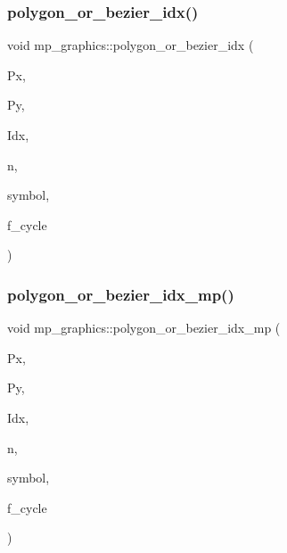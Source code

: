 \subsubsection{\texorpdfstring{polygon\+\_\+or\+\_\+bezier\+\_\+idx()}{polygon\_or\_bezier\_idx()}}
{\footnotesize\ttfamily void mp\+\_\+graphics\+::polygon\+\_\+or\+\_\+bezier\+\_\+idx (\begin{DoxyParamCaption}\item[{\mbox{\hyperlink{galois_8h_a09fddde158a3a20bd2dcadb609de11dc}{I\+NT}} $\ast$}]{Px,  }\item[{\mbox{\hyperlink{galois_8h_a09fddde158a3a20bd2dcadb609de11dc}{I\+NT}} $\ast$}]{Py,  }\item[{\mbox{\hyperlink{galois_8h_a09fddde158a3a20bd2dcadb609de11dc}{I\+NT}} $\ast$}]{Idx,  }\item[{\mbox{\hyperlink{galois_8h_a09fddde158a3a20bd2dcadb609de11dc}{I\+NT}}}]{n,  }\item[{const char $\ast$}]{symbol,  }\item[{\mbox{\hyperlink{galois_8h_a09fddde158a3a20bd2dcadb609de11dc}{I\+NT}}}]{f\+\_\+cycle }\end{DoxyParamCaption})}

\mbox{\label{classmp__graphics_ac1c736f6c02abd6df696eb949c3513ac}} 
\subsubsection{\texorpdfstring{polygon\+\_\+or\+\_\+bezier\+\_\+idx\+\_\+mp()}{polygon\_or\_bezier\_idx\_mp()}}
{\footnotesize\ttfamily void mp\+\_\+graphics\+::polygon\+\_\+or\+\_\+bezier\+\_\+idx\+\_\+mp (\begin{DoxyParamCaption}\item[{\mbox{\hyperlink{galois_8h_a09fddde158a3a20bd2dcadb609de11dc}{I\+NT}} $\ast$}]{Px,  }\item[{\mbox{\hyperlink{galois_8h_a09fddde158a3a20bd2dcadb609de11dc}{I\+NT}} $\ast$}]{Py,  }\item[{\mbox{\hyperlink{galois_8h_a09fddde158a3a20bd2dcadb609de11dc}{I\+NT}} $\ast$}]{Idx,  }\item[{\mbox{\hyperlink{galois_8h_a09fddde158a3a20bd2dcadb609de11dc}{I\+NT}}}]{n,  }\item[{const char $\ast$}]{symbol,  }\item[{\mbox{\hyperlink{galois_8h_a09fddde158a3a20bd2dcadb609de11dc}{I\+NT}}}]{f\+\_\+cycle }\end{DoxyParamCaption})}


